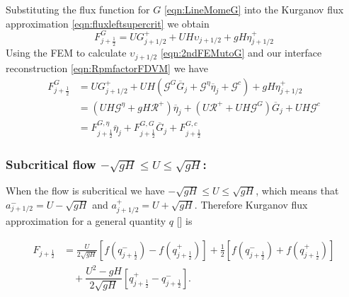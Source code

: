 Substituting the flux function for $G$ \eqref{eqn:LineMomeG} into the Kurganov flux approximation \eqref{eqn:fluxleftsupercrit} we obtain
\begin{equation*}
F^G_{j+\frac{1}{2}} =U G^+_{j+1/2} + U  H \upsilon_{j+1/2} + gH \eta^+_{j+1/2}
\end{equation*}
Using the FEM to calculate $\upsilon_{j+1/2}$ \eqref{eqn:2ndFEMutoG} and our interface reconstruction \eqref{eqn:RpmfactorFDVM} we have
\begin{align}
F^G_{j+\frac{1}{2}} &=  U G^+_{j+1/2} + UH \left(\mathcal{G}^G \overline{G}_{j} + \mathcal{G}^{\eta} \overline{\eta}_{j} + \mathcal{G}^c\right) + gH \eta^+_{j+1/2} \nonumber \\ &= \left(UH \mathcal{G}^{\eta} + gH \mathcal{R}^+ \right)  \overline{\eta}_{j} + \left(U\mathcal{R}^+  +  UH \mathcal{G}^G \right) \overline{G}_{j} + UH\mathcal{G}^c \nonumber \\
&= F^{G, \eta}_{j+\frac{1}{2}} \overline{\eta}_{j} + F^{G, G}_{j+\frac{1}{2}} \overline{G}_{j} + F^{G, c}_{j+\frac{1}{2}}
\label{eqn:FluxfactorsupercritGleft}
\end{align}


\subsubsection{Subcritical flow $-\sqrt{gH} \le U \le \sqrt{gH}$:}
When the flow is subcritical we have $-\sqrt{gH} \le U \le \sqrt{gH}$, which means that $a^-_{j+ 1/2} = U - \sqrt{g H}$ and $a^+_{j+ 1/2} =  U + \sqrt{g H}$. Therefore Kurganov flux approximation for a general quantity $q$ [] is

\begin{align}
F_{j+\frac{1}{2}} &= \frac{U}{2 \sqrt{gH}} \left[f\left(q^-_{j+\frac{1}{2}}\right) - f\left(q^+_{j+\frac{1}{2}}\right) \right]  + \frac{1}{2}\left[f\left(q^-_{j+\frac{1}{2}}\right) + f\left(q^+_{j+\frac{1}{2}}\right)\right] \nonumber \\ & \quad  + \dfrac{U^2 - gH}{2\sqrt{g H}} \left [ q^+_{j+\frac{1}{2}} - q^-_{j+\frac{1}{2}} \right ].
\label{eqn:fluxsubcrit}
\end{align}

